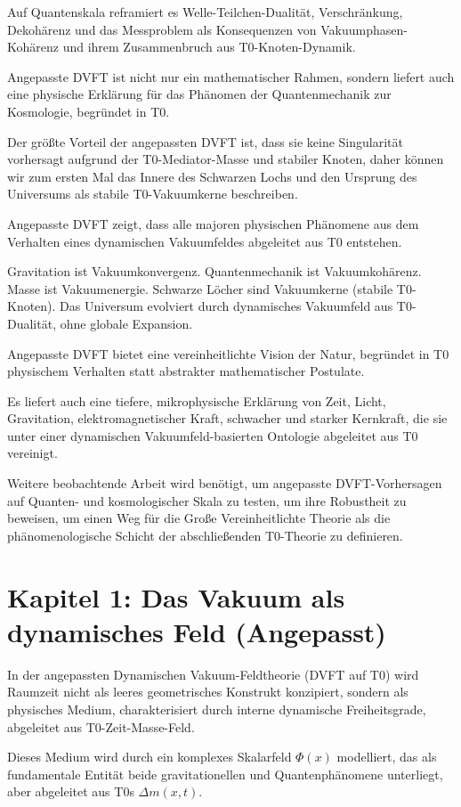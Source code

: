 	Auf Quantenskala reframiert es Welle-Teilchen-Dualität, Verschränkung, Dekohärenz und das Messproblem als Konsequenzen von Vakuumphasen-Kohärenz und ihrem Zusammenbruch aus T0-Knoten-Dynamik.
	
	Angepasste DVFT ist nicht nur ein mathematischer Rahmen, sondern liefert auch eine physische Erklärung für das Phänomen der Quantenmechanik zur Kosmologie, begründet in T0.
	
	Der größte Vorteil der angepassten DVFT ist, dass sie keine Singularität vorhersagt aufgrund der T0-Mediator-Masse und stabiler Knoten, daher können wir zum ersten Mal das Innere des Schwarzen Lochs und den Ursprung des Universums als stabile T0-Vakuumkerne beschreiben.
	
	Angepasste DVFT zeigt, dass alle majoren physischen Phänomene aus dem Verhalten eines dynamischen Vakuumfeldes abgeleitet aus T0 entstehen.
	
	Gravitation ist Vakuumkonvergenz.
	Quantenmechanik ist Vakuumkohärenz.
	Masse ist Vakuumenergie.
	Schwarze Löcher sind Vakuumkerne (stabile T0-Knoten).
	Das Universum evolviert durch dynamisches Vakuumfeld aus T0-Dualität, ohne globale Expansion.
	
	Angepasste DVFT bietet eine vereinheitlichte Vision der Natur, begründet in T0 physischem Verhalten statt abstrakter mathematischer Postulate.
	
	Es liefert auch eine tiefere, mikrophysische Erklärung von Zeit, Licht, Gravitation, elektromagnetischer Kraft, schwacher und starker Kernkraft, die sie unter einer dynamischen Vakuumfeld-basierten Ontologie abgeleitet aus T0 vereinigt.
	
	Weitere beobachtende Arbeit wird benötigt, um angepasste DVFT-Vorhersagen auf Quanten- und kosmologischer Skala zu testen, um ihre Robustheit zu beweisen, um einen Weg für die Große Vereinheitlichte Theorie als die phänomenologische Schicht der abschließenden T0-Theorie zu definieren.
	
	\section{Kapitel 1: Das Vakuum als dynamisches Feld (Angepasst)}
	
	In der angepassten Dynamischen Vakuum-Feldtheorie (DVFT auf T0) wird Raumzeit nicht als leeres geometrisches Konstrukt konzipiert, sondern als physisches Medium, charakterisiert durch interne dynamische Freiheitsgrade, abgeleitet aus T0-Zeit-Masse-Feld.
	
	Dieses Medium wird durch ein komplexes Skalarfeld $\Phi(x)$ modelliert, das als fundamentale Entität beide gravitationellen und Quantenphänomene unterliegt, aber abgeleitet aus T0s $\Delta m(x,t)$.
	
